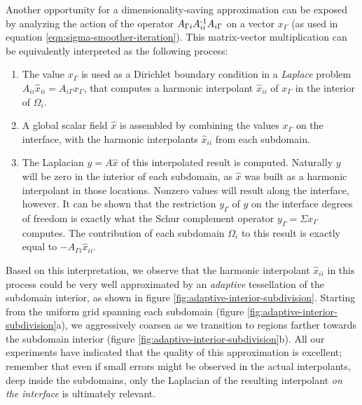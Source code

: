Another opportunity for a dimensionality-saving approximation can be exposed by analyzing the action of the operator $A_{\Gamma i}A_{ii}^{\operatorname{-1}}A_{i \Gamma}$ on a
vector $x_\Gamma$ (as used in equation \ref{eqn:sigma-smoother-iteration}). This matrix-vector multiplication can be equivalently interpreted as the
following process:
\begin{enumerate}
\item The value $x_\Gamma$ is used as a Dirichlet boundary condition in a \emph{Laplace} problem $A_{ii}\hat{x}_{ii}=A_{i \Gamma}x_\Gamma$, that computes a harmonic
  interpolant $\hat{x}_{ii}$ of $x_\Gamma$ in the interior of $\Omega_i$.
\item A global scalar field $\hat{x}$ is assembled by combining the values $x_\Gamma$ on the interface, with the harmonic interpolants $\hat{x}_{ii}$ from each
  subdomain.
\item The Laplacian $y=A\hat{x}$ of this interpolated result is computed. Naturally $y$ will be zero in the interior of each subdomain, as $\hat{x}$ was built as a
  harmonic interpolant in those locations. Nonzero values will result along the interface, however. It can be shown that the restriction $y_\Gamma$ of $y$ on the
  interface degrees of freedom is exactly what the Schur complement operator $y_\Gamma=\Sigma x_\Gamma$ computes. The contribution of each subdomain $\Omega_i$ to
  this result is exactly equal to $-A_{\Gamma i}\hat{x}_{ii}$. 
\end{enumerate}
Based on this interpretation, we observe that the harmonic interpolant $\hat{x}_{ii}$ in this process could be very well approximated by an \emph{adaptive}
tessellation of the subdomain interior, as shown in figure \ref{fig:adaptive-interior-subdivision}. Starting from the uniform grid spanning each subdomain (figure
\ref{fig:adaptive-interior-subdivision}a), we aggressively coarsen as we transition to regions farther towards the subdomain interior (figure
\ref{fig:adaptive-interior-subdivision}b). All our experiments have indicated that the quality of this approximation is excellent; remember that even if small errors
might be observed in the actual interpolants, deep inside the subdomains, only the Laplacian of the resulting interpolant \emph{on the interface} is ultimately
relevant. 

